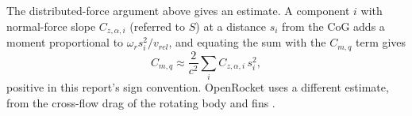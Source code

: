 The distributed-force argument above gives an estimate. A component $i$ with normal-force slope
$C_{z,\alpha,i}$ (referred to $S$) at a distance $s_i$ from the CoG adds a moment proportional to
$\omega_r s_i^2/v_{rel}$, and equating the sum with the $C_{m,q}$ term gives
\begin{equation}
    C_{m,q} \approx \frac{2}{c^2}\sum_i C_{z,\alpha,i}\,s_i^2 ,
\end{equation}
positive in this report's sign convention. OpenRocket uses a different estimate, from the cross-flow
drag of the rotating body and fins \cite{ortech}.
